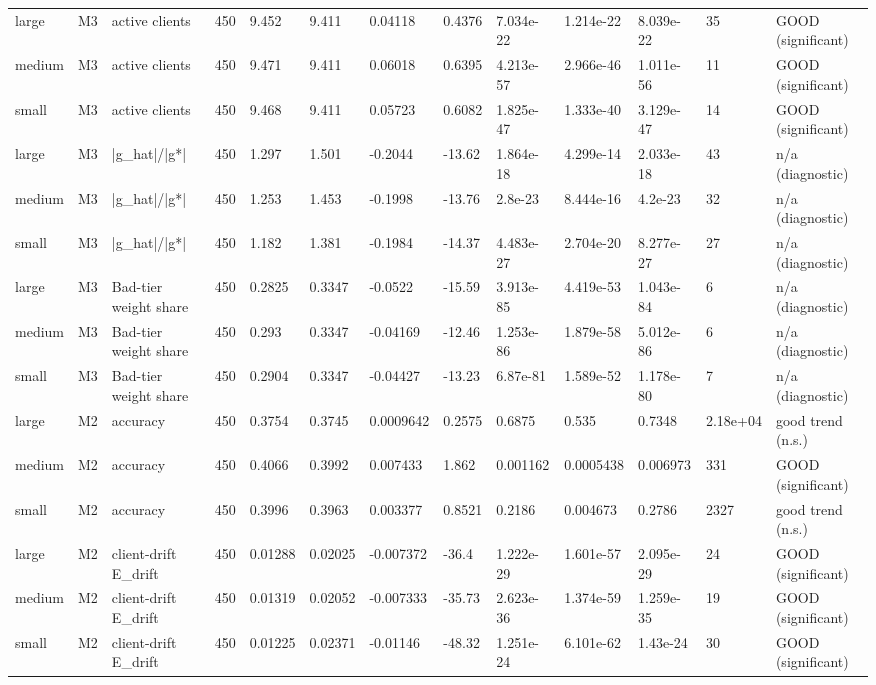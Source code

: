 \begin{table}[t]
\begin{tabular}{lllllllllllll}
large & M3 & active clients & 450 & 9.452 & 9.411 & 0.04118 & 0.4376 & 7.034e-22 & 1.214e-22 & 8.039e-22 & 35 & GOOD (significant) \\
medium & M3 & active clients & 450 & 9.471 & 9.411 & 0.06018 & 0.6395 & 4.213e-57 & 2.966e-46 & 1.011e-56 & 11 & GOOD (significant) \\
small & M3 & active clients & 450 & 9.468 & 9.411 & 0.05723 & 0.6082 & 1.825e-47 & 1.333e-40 & 3.129e-47 & 14 & GOOD (significant) \\
large & M3 & |g\_hat|/|g*| & 450 & 1.297 & 1.501 & -0.2044 & -13.62 & 1.864e-18 & 4.299e-14 & 2.033e-18 & 43 & n/a (diagnostic) \\
medium & M3 & |g\_hat|/|g*| & 450 & 1.253 & 1.453 & -0.1998 & -13.76 & 2.8e-23 & 8.444e-16 & 4.2e-23 & 32 & n/a (diagnostic) \\
small & M3 & |g\_hat|/|g*| & 450 & 1.182 & 1.381 & -0.1984 & -14.37 & 4.483e-27 & 2.704e-20 & 8.277e-27 & 27 & n/a (diagnostic) \\
large & M3 & Bad-tier weight share & 450 & 0.2825 & 0.3347 & -0.0522 & -15.59 & 3.913e-85 & 4.419e-53 & 1.043e-84 & 6 & n/a (diagnostic) \\
medium & M3 & Bad-tier weight share & 450 & 0.293 & 0.3347 & -0.04169 & -12.46 & 1.253e-86 & 1.879e-58 & 5.012e-86 & 6 & n/a (diagnostic) \\
small & M3 & Bad-tier weight share & 450 & 0.2904 & 0.3347 & -0.04427 & -13.23 & 6.87e-81 & 1.589e-52 & 1.178e-80 & 7 & n/a (diagnostic) \\
large & M2 & accuracy & 450 & 0.3754 & 0.3745 & 0.0009642 & 0.2575 & 0.6875 & 0.535 & 0.7348 & 2.18e+04 & good trend (n.s.) \\
medium & M2 & accuracy & 450 & 0.4066 & 0.3992 & 0.007433 & 1.862 & 0.001162 & 0.0005438 & 0.006973 & 331 & GOOD (significant) \\
small & M2 & accuracy & 450 & 0.3996 & 0.3963 & 0.003377 & 0.8521 & 0.2186 & 0.004673 & 0.2786 & 2327 & good trend (n.s.) \\
large & M2 & client-drift E\_drift & 450 & 0.01288 & 0.02025 & -0.007372 & -36.4 & 1.222e-29 & 1.601e-57 & 2.095e-29 & 24 & GOOD (significant) \\
medium & M2 & client-drift E\_drift & 450 & 0.01319 & 0.02052 & -0.007333 & -35.73 & 2.623e-36 & 1.374e-59 & 1.259e-35 & 19 & GOOD (significant) \\
small & M2 & client-drift E\_drift & 450 & 0.01225 & 0.02371 & -0.01146 & -48.32 & 1.251e-24 & 6.101e-62 & 1.43e-24 & 30 & GOOD (significant) \\

\end{tabular}
\end{table}
